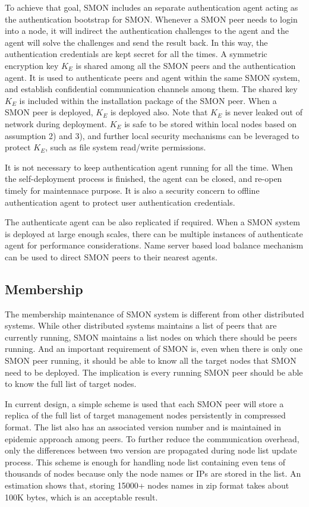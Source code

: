 To achieve that goal, SMON includes an separate
authentication agent acting as the authentication bootstrap
for SMON.  Whenever a SMON peer needs to login into a node,
it will indirect the authentication challenges to the agent
and the agent will solve the challenges and send the result
back. In this way, the authentication credentials are kept
secret for all the times. A symmetric encryption key $K_E$
is shared among all the SMON peers and the authentication
agent. It is used to authenticate peers and agent within the
same SMON system, and establish confidential communication
channels among them. The shared key $K_E$ is included within
the installation package of the SMON peer. When a SMON peer
is deployed, $K_E$ is deployed also. Note that $K_E$ is
never leaked out of network during deployment. $K_E$ is safe
to be stored within local nodes based on assumption 2) and
3), and further local security mechanisms can be leveraged
to protect $K_E$, such as file system read/write
permissions.

It is not necessary to keep authentication agent running for
all the time.  When the self-deployment process is finished,
the agent can be closed, and re-open timely for maintennace
purpose.  It is also a security concern to offline
authentication agent to protect user authentication
credentials.

The authenticate agent can be also replicated if required.
When a SMON system is deployed at large enough scales, there
can be multiple instances of authenticate agent for
performance considerations. Name server based load balance
mechanism\cite{} can be used to direct SMON peers to their nearest
agents.

\subsection{Membership}

The membership maintenance of SMON system is different from
other distributed systems. While other distributed systems
maintains a list of peers that are currently running, SMON
maintains a list nodes on which there should be peers
running.  And an important requirement of SMON is, even when
there is only one SMON peer running, it should be able to
know all the target nodes that SMON need to be deployed. The
implication is every running SMON peer should be able to
know the full list of target nodes.

In current design, a simple scheme is used that each SMON
peer will store a replica of the full list of target
management nodes persistently in compressed format. The list
also has an associated version number and is maintained in
epidemic approach among peers. To further reduce the
communication overhead, only the differences between two
version are propagated during node list update process. This
scheme is enough for handling node list containing even tens
of thousands of nodes because only the node names or IPs are
stored in the list.  An estimation shows that, storing
15000+ nodes names in zip format takes about 100K bytes,
which is an acceptable result.

